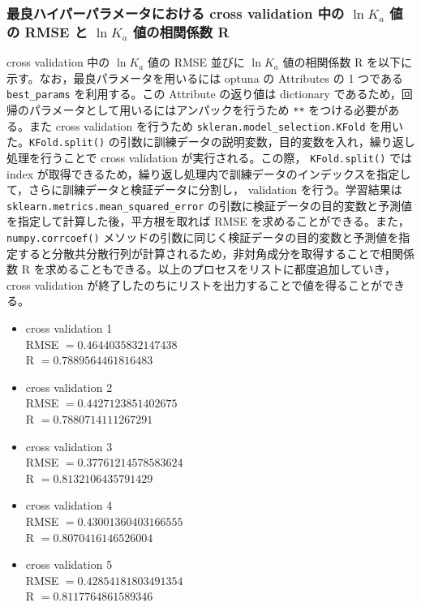 \documentclass[a4j,11pt]{jarticle}
\begin{document}
\subsubsection{最良ハイパーパラメータにおける cross validation 中の $\ln{K_a}$ 値の RMSE と $\ln{K_a}$ 値の相関係数 R}
 cross validation 中の $\ln{K_a}$ 値の RMSE 並びに $\ln{K_a}$ 値の相関係数 R を以下に示す。なお，最良パラメータを用いるには optuna の Attributes の 1 つである \texttt{best\_params} を利用する。この Attribute の返り値は dictionary であるため，回帰のパラメータとして用いるにはアンパックを行うため \texttt{**} をつける必要がある。また cross validation を行うため \texttt{skleran.model\_selection.KFold} を用いた。\texttt{KFold.split()} の引数に訓練データの説明変数，目的変数を入れ，繰り返し処理を行うことで cross validation が実行される。この際， \texttt{KFold.split()} では index が取得できるため，繰り返し処理内で訓練データのインデックスを指定して，さらに訓練データと検証データに分割し， validation を行う。学習結果は \texttt{sklearn.metrics.mean\_squared\_error} の引数に検証データの目的変数と予測値を指定して計算した後，平方根を取れば RMSE を求めることができる。また， \texttt{numpy.corrcoef()} メソッドの引数に同じく検証データの目的変数と予測値を指定すると分散共分散行列が計算されるため，非対角成分を取得することで相関係数 R を求めることもできる。以上のプロセスをリストに都度追加していき， cross validation が終了したのちにリストを出力することで値を得ることができる。\\
\begin{itemize}
\item  cross validation 1\\
RMSE $= 0.4644035832147438$\\
R $= 0.7889564461816483$ \\
\item  cross validation 2\\
RMSE $= 0.4427123851402675$\\
R $= 0.7880714111267291$ \\
\item  cross validation 3\\
RMSE $= 0.37761214578583624$\\
R $= 0.8132106435791429$ \\
\item  cross validation 4\\
RMSE $= 0.43001360403166555$\\
R $= 0.8070416146526004$ \\
\item  cross validation 5\\
RMSE $= 0.42854181803491354$\\
R $= 0.8117764861589346$ \\
\end{itemize}
\end{document}

